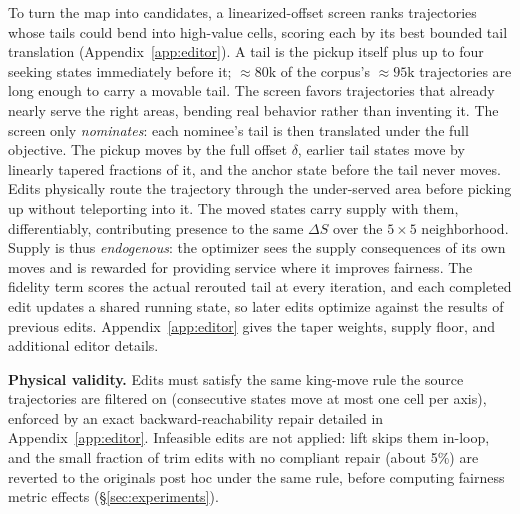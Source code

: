To turn the map into candidates, a linearized-offset screen ranks trajectories
whose tails could bend into high-value cells, scoring each by its best bounded
tail translation (Appendix~\ref{app:editor}). A tail is the pickup itself plus
up to four seeking states immediately before it; ${\approx}80$k of the
corpus's ${\approx}95$k trajectories are long enough to carry a movable tail.
The screen favors trajectories that already nearly serve the right areas,
bending real behavior rather than inventing it.
The screen only \emph{nominates}: each nominee's tail is then translated under
the full objective. The pickup moves by the full offset $\delta$, earlier tail
states move by linearly tapered fractions of it, and the anchor state before
the tail never moves. Edits physically route the trajectory through the
under-served area before picking up without teleporting into it. The moved
states carry supply with them, differentiably, contributing presence to
the same $\Delta S$ over the $5{\times}5$ neighborhood. Supply is thus
\emph{endogenous}: the optimizer sees the supply
consequences of its own moves and is rewarded for providing service where it
improves fairness. The fidelity term
scores the actual rerouted tail at every iteration, and each completed edit
updates a shared running state, so later edits optimize against the results of
previous edits. Appendix~\ref{app:editor} gives the taper weights,
supply floor, and additional editor details.

\textbf{Physical validity.}\label{sec:phys-validity} Edits must satisfy the same king-move rule the
source trajectories are filtered on (consecutive states move at most one
cell per axis), enforced by an exact backward-reachability repair detailed
in Appendix~\ref{app:editor}. Infeasible edits are not applied: lift skips
them in-loop, and the small fraction of trim edits with no compliant repair
(about 5\%) are reverted to the originals post hoc under the same rule,
before computing fairness metric effects (\S\ref{sec:experiments}).

